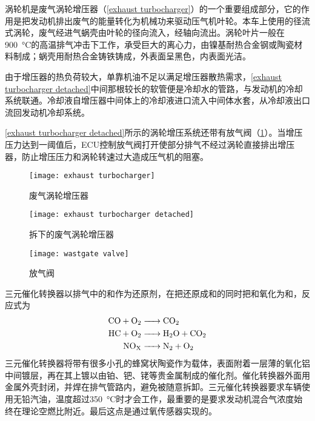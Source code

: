 \documentclass[UTF8]{ctexart}
\numberwithin{figure}{section}
\numberwithin{table}{section}
\begin{document}
涡轮机是废气涡轮增压器（\cref{exhaust turbocharger}）的一个重要组成部分，它的作用是把发动机排出废气的能量转化为机械功来驱动压气机叶轮。本车上使用的径流式涡轮，废气经进气蜗壳由叶轮的径向流入，经轴向流出。涡轮叶片一般在\SI{900}{\celsius}的高温排气冲击下工作，承受巨大的离心力，由镍基耐热合金钢或陶瓷材料制成；蜗壳用耐热合金铸铁铸成，外表面呈黑色，内表面光洁。

由于增压器的热负荷较大，单靠机油不足以满足增压器散热需求，\cref{exhaust turbocharger detached}中间那根较长的软管便是冷却水的管路，与发动机的冷却系统联通。冷却液自增压器中间体上的冷却液进口流入中间体水套，从冷却液出口流回发动机冷却系统。

\cref{exhaust turbocharger detached}所示的涡轮增压系统还带有放气阀（\cref{wastgate valve}）。当增压压力达到一阈值后，ECU控制放气阀打开使部分排气不经过涡轮直接排出增压器，防止增压压力和涡轮转速过大造成压气机的阻塞。

\begin{figure}[htbp]
	\centering
	\begin{minipage}[b]{0.4\textwidth}
		\centering
		\texttt{[image: exhaust turbocharger]}
		\caption{废气涡轮增压器}
		\label{exhaust turbocharger}
	\end{minipage}
	\centering
	\begin{minipage}[b]{0.35\textwidth}
		\centering
		\texttt{[image: exhaust turbocharger detached]}
		\caption{拆下的废气涡轮增压器}
		\label{exhaust turbocharger detached}
	\end{minipage}
	\begin{minipage}[b]{0.18\textwidth}
		\centering
		\texttt{[image: wastgate valve]}
		\caption{放气阀}
		\label{wastgate valve}
	\end{minipage}
\end{figure}

三元催化转换器以排气中的和作为还原剂，在把还原成和的同时把和氧化为和，反应式为
\begin{align}
	\ce{CO + O2 & -> CO2} \nonumber       \\
	\ce{HC + O2 & -> H2O + CO2} \nonumber \\
	\ce{NO_X    & -> N2 + O2} \nonumber
\end{align}
三元催化转换器将带有很多小孔的蜂窝状陶瓷作为载体，表面附着一层薄的氧化铝中间镀层，再在其上镀以由铂、钯、铑等贵金属制成的催化剂。催化转换器外面用金属外壳封闭，并焊在排气管路内，避免被随意拆卸。三元催化转换器要求车辆使用无铅汽油，温度超过\SI{350}{\celsius}时才会工作，最重要的是要求发动机混合气浓度始终在理论空燃比附近。最后这点是通过氧传感器实现的。
\end{document}
